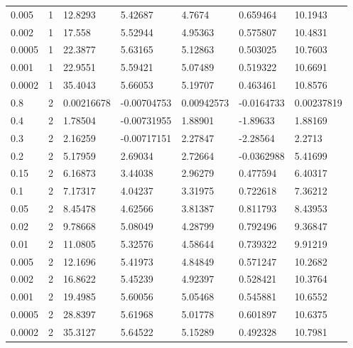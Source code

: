 \begin{tabular}{lllllll}
0.005 & 1 & 12.8293 & 5.42687 & 4.7674 & 0.659464 & 10.1943 \\
0.002 & 1 & 17.558 & 5.52944 & 4.95363 & 0.575807 & 10.4831 \\
0.0005 & 1 & 22.3877 & 5.63165 & 5.12863 & 0.503025 & 10.7603 \\
0.001 & 1 & 22.9551 & 5.59421 & 5.07489 & 0.519322 & 10.6691 \\
0.0002 & 1 & 35.4043 & 5.66053 & 5.19707 & 0.463461 & 10.8576 \\
0.8 & 2 & 0.00216678 & -0.00704753 & 0.00942573 & -0.0164733 & 0.00237819 \\
0.4 & 2 & 1.78504 & -0.00731955 & 1.88901 & -1.89633 & 1.88169 \\
0.3 & 2 & 2.16259 & -0.00717151 & 2.27847 & -2.28564 & 2.2713 \\
0.2 & 2 & 5.17959 & 2.69034 & 2.72664 & -0.0362988 & 5.41699 \\
0.15 & 2 & 6.16873 & 3.44038 & 2.96279 & 0.477594 & 6.40317 \\
0.1 & 2 & 7.17317 & 4.04237 & 3.31975 & 0.722618 & 7.36212 \\
0.05 & 2 & 8.45478 & 4.62566 & 3.81387 & 0.811793 & 8.43953 \\
0.02 & 2 & 9.78668 & 5.08049 & 4.28799 & 0.792496 & 9.36847 \\
0.01 & 2 & 11.0805 & 5.32576 & 4.58644 & 0.739322 & 9.91219 \\
0.005 & 2 & 12.1696 & 5.41973 & 4.84849 & 0.571247 & 10.2682 \\
0.002 & 2 & 16.8622 & 5.45239 & 4.92397 & 0.528421 & 10.3764 \\
0.001 & 2 & 19.4985 & 5.60056 & 5.05468 & 0.545881 & 10.6552 \\
0.0005 & 2 & 28.8397 & 5.61968 & 5.01778 & 0.601897 & 10.6375 \\
0.0002 & 2 & 35.3127 & 5.64522 & 5.15289 & 0.492328 & 10.7981 \\
\bottomrule
\end{tabular}
